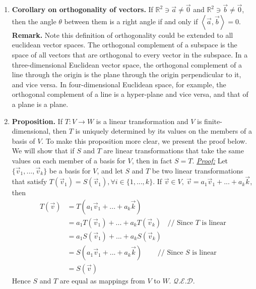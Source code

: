 \documentclass[oneside, 12pt]{book}
\newcommand{\settag}[1]{\renewcommand{\theenumi}{#1}}
\newcommand{\R}{\mathbb{R}}
\newcommand{\qed}{\hfill $\mathcal{Q}.\mathcal{E}.\mathcal{D}.$}
\newcommand{\tbf}[1]{\textbf{#1}}
\newcommand{\tit}[1]{\textit{#1}}
\begin{document}
\begin{enumerate}
        \settag{2.1.10}
        \item \tbf{Corollary on orthogonality of vectors.} If $\R^2\ni \vec{a}\neq \vec{0}$ and $\R^2\ni \vec{b}\neq \vec{0}$, then the angle $\theta$ between them is a right angle if and only if $\left<\vec{a},\vec{b}\right>=0$.\newline
        \tbf{Remark.} Note this definition of orthogonality could be extended to all euclidean vector spaces. The orthogonal complement of a subspace is the space of all vectors that are orthogonal to every vector in the subspace. In a three-dimensional Euclidean vector space, the orthogonal complement of a line through the origin is the plane through the origin perpendicular to it, and vice versa. In four-dimensional Euclidean space, for example, the orthogonal complement of a line is a hyper-plane and vice versa, and that of a plane is a plane.
        
        \settag{2.1.14}
        \item \tbf{Proposition.} If $T:V\xrightarrow{}W$ is a linear transformation and $V$ is finite-dimensional, then $T$ is uniquely determined by its values on the members of a basis of $V$. To make this proposition more clear, we present the proof below. We will show that if $S$ and $T$ are linear transformations that take the same values on each member of a basis for $V$, then in fact $S=T$.\newline
        \tit{\underline{Proof:}} \newline
        Let $\{ \vec{v}_1, ..., \vec{v}_k\}$ be a basis for $V$, and let $S$ and $T$ be two linear transformations that satisfy $T(\vec{v}_1)=S(\vec{v}_1), \forall i \in \{1,...,k\}$. If $\vec{v}\in V, ~\vec{v} = a_1\vec{v}_1 + ... + a_k\vec{k}$, then
        \begin{align*}
            T(\vec{v}) &= T(a_1\vec{v}_1 + ... + a_k\vec{k}) \\
            &= a_1T(\vec{v}_1) + ... + a_k T(\vec{v}_k)~~~~\text{// Since $T$ is linear}\\
            &= a_1S(\vec{v}_1) + ... + a_k S(\vec{v}_k) \\
            &= S(a_1\vec{v}_1 + ... + a_k\vec{k})~~~~~~~~~~\text{//  Since $S$ is linear} \\
            &=S(\vec{v})
        \end{align*}
        Hence $S$ and $T$ are equal as mappings from $V$ to $W$. \qed
        
    \end{enumerate}
    
\end{document}
